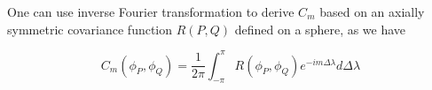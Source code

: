 		
		One can use inverse Fourier transformation to derive $C_m$ based on an axially symmetric covariance function $R(P,Q)$ defined on a sphere, as we have
		
	\[ 
	C_m(\phi_P, \phi_Q) = \frac{1}{2\pi}\int_{-\pi}^{\pi} R(\phi_P, \phi_Q)e^{-im\Delta\lambda} d\Delta\lambda \]
	
	
% 	
% 
% 		
		

